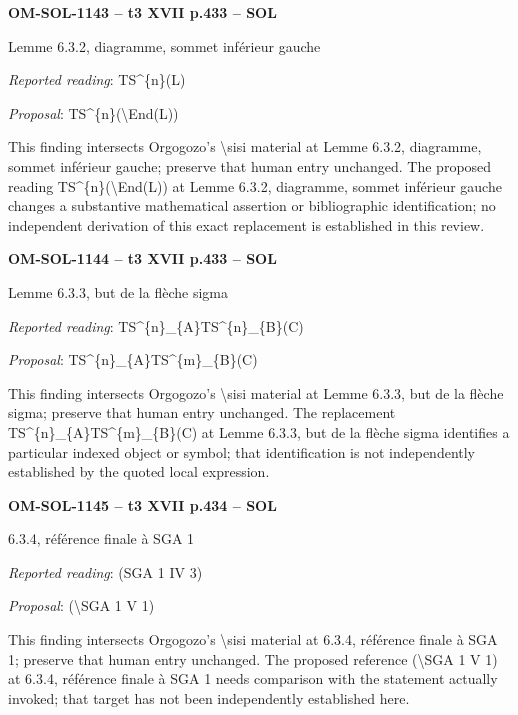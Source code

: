 \par\noindent\textbf{OM-SOL-1143 -- t3 XVII p.433 -- SOL}\par
Lemme 6.3.2, diagramme, sommet inférieur gauche\par
\emph{Reported reading}: TS\textasciicircum{}\{n\}(L)\par
\emph{Proposal}: TS\textasciicircum{}\{n\}(\textbackslash{}End(L))\par
This finding intersects Orgogozo's \textbackslash{}sisi material at Lemme 6.3.2, diagramme, sommet inférieur gauche; preserve that human entry unchanged. The proposed reading TS\textasciicircum{}\{n\}(\textbackslash{}End(L)) at Lemme 6.3.2, diagramme, sommet inférieur gauche changes a substantive mathematical assertion or bibliographic identification; no independent derivation of this exact replacement is established in this review.\par
\par\noindent\textbf{OM-SOL-1144 -- t3 XVII p.433 -- SOL}\par
Lemme 6.3.3, but de la flèche sigma\par
\emph{Reported reading}: TS\textasciicircum{}\{n\}\_\{A\}TS\textasciicircum{}\{n\}\_\{B\}(C)\par
\emph{Proposal}: TS\textasciicircum{}\{n\}\_\{A\}TS\textasciicircum{}\{m\}\_\{B\}(C)\par
This finding intersects Orgogozo's \textbackslash{}sisi material at Lemme 6.3.3, but de la flèche sigma; preserve that human entry unchanged. The replacement TS\textasciicircum{}\{n\}\_\{A\}TS\textasciicircum{}\{m\}\_\{B\}(C) at Lemme 6.3.3, but de la flèche sigma identifies a particular indexed object or symbol; that identification is not independently established by the quoted local expression.\par
\par\noindent\textbf{OM-SOL-1145 -- t3 XVII p.434 -- SOL}\par
6.3.4, référence finale à SGA 1\par
\emph{Reported reading}: (SGA 1 IV 3)\par
\emph{Proposal}: (\textbackslash{}SGA 1 V 1)\par
This finding intersects Orgogozo's \textbackslash{}sisi material at 6.3.4, référence finale à SGA 1; preserve that human entry unchanged. The proposed reference (\textbackslash{}SGA 1 V 1) at 6.3.4, référence finale à SGA 1 needs comparison with the statement actually invoked; that target has not been independently established here.\par
